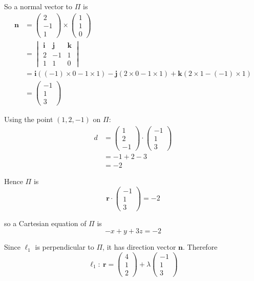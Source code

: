\documentclass[leqno]{article}
\begin{document}
\begin{enumerate}[
  label=\textbf{\arabic*.},
  leftmargin=*,
  topsep=0pt,
  partopsep=0pt,
  parsep=0pt
]
\begin{djsSolution}
\begin{enumerate}[label=\textbf{(\alph*)}]
So a normal vector to \(\Pi\) is
\begin{align*}
\mathbf n
&=
\begin{pmatrix}2\\-1\\1\end{pmatrix}
\times
\begin{pmatrix}1\\1\\0\end{pmatrix}\\
&=
\begin{vmatrix}
\mathbf i & \mathbf j & \mathbf k\\
2 & -1 & 1\\
1 & 1 & 0
\end{vmatrix}\\
&=\mathbf i((-1)\times 0-1\times 1)-\mathbf j(2\times 0-1\times 1)+\mathbf k(2\times 1-(-1)\times 1)\\
&=
\begin{pmatrix}-1\\1\\3\end{pmatrix}
\end{align*}

Using the point \((1,2,-1)\) on \(\Pi\):
\begin{align*}
d
&=
\begin{pmatrix}1\\2\\-1\end{pmatrix}\cdot
\begin{pmatrix}-1\\1\\3\end{pmatrix}\\
&=-1+2-3\\
&=-2
\end{align*}

Hence \(\Pi\) is
\[
\mathbf r\cdot \begin{pmatrix}-1\\1\\3\end{pmatrix}=-2
\]

so a Cartesian equation of \(\Pi\) is
\[
-x+y+3z=-2
\]

Since \(\ell_1\) is perpendicular to \(\Pi\), it has direction vector \(\mathbf n\). Therefore
\[
\ell_1:\ \mathbf r=
\begin{pmatrix}4\\1\\2\end{pmatrix}
+\lambda
\begin{pmatrix}-1\\1\\3\end{pmatrix}
\]


\end{enumerate}
\end{djsSolution}
\end{enumerate}
\end{document}
